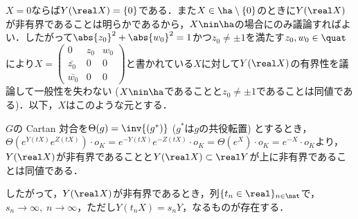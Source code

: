 \begin{npfwn}
  
  $X = 0$ならば$ Y(\real X) = \{0\} $である．また$X\in \ha\setminus\{0\} $のときに$Y(\real X) $が非有界であることは明らかであるから，$X\nin \ha $の場合にのみ議論すればよい．したがって$\abs{z_0}^2 +\abs{w_0}^2  = 1 $かつ$ z_0 \neq \pm 1 $を満たす$z_0,w_0\in \quat$により$X =  \begin{pmatrix}
    0 & z_0 & w_0 \\
    \bar{z_0} & 0 & 0 \\
    \bar{w_0} & 0 & 0 
  \end{pmatrix}$と書かれている$X$に対して$Y(\real X) $の有界性を議論して一般性を失わない ($X\nin \ha $であることと$z_0\neq \pm 1$であることは同値である)．以下，$X$はこのような元とする．%

  $G$の Cartan 対合を$\Theta(g) = \inv{(g^{*})} $ ($g^{*}$は$g$の共役転置) とするとき，$\Theta(e^{Y(tX)}e^{Z(tX)})\cdot o_K = e^{-Y(tX)}e^{-Z(tX)}\cdot o_K = \Theta(e^{X})\cdot o_K = e^{-X}\cdot o_K $より，$Y(\real X) $が非有界であることと$ Y(\real X)\subset \real Y $が上に非有界であることは同値である．

  したがって，$Y (\real X) $が非有界であるとき，列$\{t_n \in \real \}_{n\in \nat} $で，$s_n\to \infty,\; n\to \infty$，ただし$Y(t_n X) = s_n Y$，なるものが存在する．


\end{npfwn}
